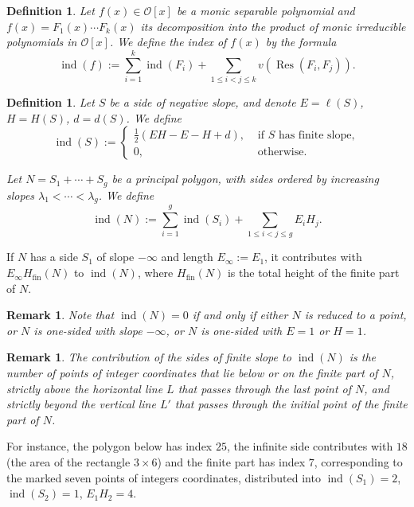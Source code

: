 \documentclass{amsart}
\newtheorem{remark}[theorem]{Remark}
\newtheorem{definition}[theorem]{Definition}
\def\op{\operatorname}
\def\ind{\op{ind}}
\def\la{\lambda}
\def\oo{{\mathcal O}}
\def\res{\op{Res}}
\def\zpx{\oo[x]}
\begin{document}
\begin{definition}
Let  $f(x)\in\zpx$ be a monic separable polynomial and $f(x)=F_1(x)\cdots F_k(x)$ its decomposition into the product of monic irreducible polynomials in $\zpx$. We define the \emph{index} of $f(x)$ by the formula
$$
\ind(f):=\sum_{i=1}^k\ind(F_i)+\sum_{1\le i<j\le k}v(\res(F_i,F_j)).
$$ 
\end{definition}

\begin{definition}
Let $S$ be a side of negative slope, and denote $E=\ell(S)$, $H=H(S)$, $d=d(S)$. We define 
$$\ind(S):=\left\{\begin{array}{ll}
\frac12(EH-E-H+d),&\mbox{ if $S$ has finite slope},\\
0,&\mbox{ otherwise}.
\end{array}
\right.
$$

Let $N=S_1+\cdots+S_g$ be a principal polygon, with sides ordered by increasing slopes $\la_1<\cdots<\la_g$. We define
$$
\ind(N):=\sum_{i=1}^g\ind(S_i)+\sum_{1\le i<j\le g}E_iH_j.
$$
\end{definition}
If $N$ has a side $S_1$ of slope $-\infty$ and length $E_{\infty}:=E_1$, it contributes with $E_{\infty}H_{\op{fin}}(N)$ to $\ind(N)$, where $H_{\op{fin}}(N)$ is the total height of the finite part of $N$. 

\begin{remark}\label{indzero}
Note that $\ind(N)=0$ if and only if either $N$ is reduced to a point, or $N$ is one-sided with slope $-\infty$, or  $N$ is one-sided with $E=1$ or $H=1$.
\end{remark}

\begin{remark}\label{region}
The contribution of the sides of finite slope to $\ind(N)$ is the number of points of integer coordinates that lie below or on the finite part of $N$, strictly above the horizontal line $L$ that passes through the last point of $N$, and strictly beyond the vertical line $L'$ that passes through the initial point of the finite part of $N$. 
\end{remark}

For instance, the polygon below has index $25$, the infinite side contributes with $18$ (the area of the rectangle $3\times 6$) and the finite part has index $7$, corresponding to the marked seven points of integers coordinates, distributed into $\ind(S_1)=2$, $\ind(S_2)=1$, $E_1H_2=4$.
\end{document}
